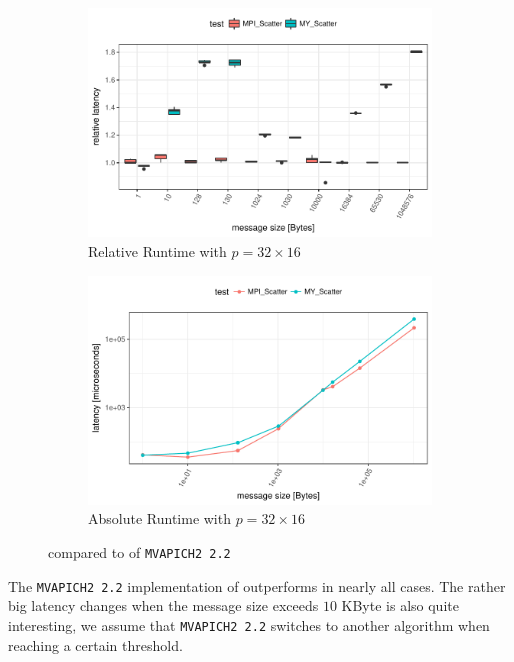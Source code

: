 \begin{figure}[H]
    \begin{subfigure}[b]{0.49\textwidth}
        \includegraphics[width=\textwidth]{../benchmarks/mpich/divide_conquer/scatter_32/rel_runtime.pdf}
        \caption{Relative Runtime with $p=32 \times 16$}
        \label{fig:Scatter:MPICH:Rel:32}
    \end{subfigure}
    \begin{subfigure}[b]{0.49\textwidth}
        \includegraphics[width=\textwidth]{../benchmarks/mpich/divide_conquer/scatter_32/runtime.pdf}
        \caption{Absolute Runtime with $p=32 \times 16$}
        \label{fig:Scatter:MPICH:Abs:32}
    \end{subfigure}
    
    \caption{\myscatter compared to \mpiscatter of \texttt{MVAPICH2 2.2}}
\end{figure}

\noindent The \texttt{MVAPICH2 2.2} implementation of \mpigather outperforms \mygather in nearly all cases. The rather big latency changes when the message size exceeds $10$ KByte is also quite interesting, we assume that \texttt{MVAPICH2 2.2} switches to another algorithm when reaching a certain threshold.

